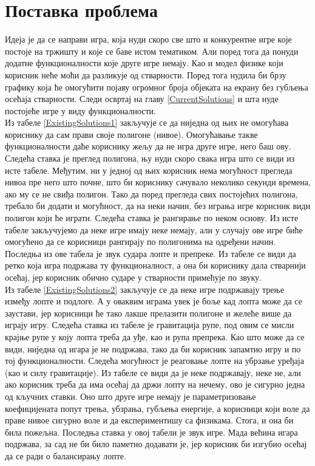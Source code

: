 \chapter{Поставка проблема}\label{GameProblem}

Идеја је да се направи игра, која нуди скоро све што и конкурентне игре које постоје на тржишту и које се баве истом тематиком. Али поред тога да понуди  додатне функционалности које друге игре немају. Као и модел физике који корисник неће моћи да разликује од стварности. Поред тога нудила би брзу графику која ће омогућити појаву огромног броја објеката на екрану без губљења осећаја стварности. Следи освртај на главу \ref{CurrentSolutions} и шта нуде постојеће игре у виду функционалности.
\\ \indent
 Из табеле \ref{ExistingSolutions1} закључује се да ниједна од њих не омогућава кориснику да сам прави своје полигоне (нивое). Омогућавање такве функционалности даће кориснику жељу да не игра друге игре, него баш ову. Следећа ставка је преглед полигона, њу нуди скоро свака игра што се види из исте табеле. Међутим, ни у једној од њих корисник нема могућност прегледа нивоа пре него што почне, што би кориснику сачувало неколико секунди времена, ако му се не свиђа полигон. Тако да поред прегледа свих постојећих полигона, требало би додати и могућност, да на неки начин, без играња игре корисник види полигон који ће играти. Следећа ставка је рангирање по неком основу. Из исте табеле закључујемо да неке игре имају неке немају, али у случају ове игре биће омогућено да се корисници рангирају по полигонима на одређени начин. Последња из ове табела је звук судара лопте и препреке. Из табеле се види да ретко која игра подржава ту функционалност, а она би кориснику дала стварнији осећај, јер корисник обично сударе у стварности примећује по звуку.
\\ \indent
Из табеле \ref{ExistingSolutions2} закључује се да неке игре подржавају трење између лопте и подлоге. А у оваквим играма увек је боље кад лопта може да се заустави, јер корисници ће тако лакше прелазити полигоне и желеће више да играју игру. Следећа ставка из табеле је гравитација рупе, под овим се мисли крајње рупе у коју лопта треба да уђе, као и рупа препрека. Као што може да се види, ниједна од игара је не подржава, тако да би корисник запамтио игру и по тој функционалности. Следећа могућност је реаговање лопте на убрзање уређаја (као и силу гравитације). Из табеле се види да је неке подржавају, неке не, али ако корисник треба да има осећај да држи лопту на нечему, ово је сигурно једна од кључних ставки. Оно што друге игре немају је параметризовање коефицијената попут трења, убзрања, губљења енергије, а корисници који воле да праве нивое сигурно воле и да експериментишу са физикама. Стога, и она би била пожељна. Последња ставка у овој табели је звук игре. Мада већина игара подржава, за сад не би било паметно додавати је, јер корисник би изгубио осећај да се ради о балансирању лопте.
